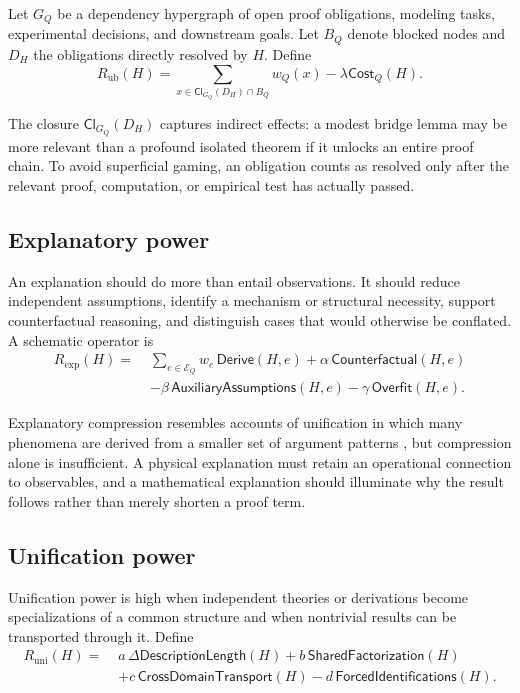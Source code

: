 \documentclass[11pt]{article}
\newcommand{\Cl}{\mathsf{Cl}}
\newcommand{\Cost}{\mathsf{Cost}}
\begin{document}
Let $G_Q$ be a dependency hypergraph of open proof obligations, modeling tasks, experimental
decisions, and downstream goals. Let $B_Q$ denote blocked nodes and $D_H$ the obligations directly
resolved by $H$. Define
\begin{equation}
R_{\mathrm{ub}}(H)
=
\sum_{x\in \Cl_{G_Q}(D_H)\cap B_Q}w_Q(x)
-\lambda\Cost_Q(H).
\end{equation}

The closure $\Cl_{G_Q}(D_H)$ captures indirect effects: a modest bridge lemma may be more relevant
than a profound isolated theorem if it unlocks an entire proof chain. To avoid superficial gaming,
an obligation counts as resolved only after the relevant proof, computation, or empirical test has
actually passed.

\subsection{Explanatory power}

An explanation should do more than entail observations. It should reduce independent assumptions,
identify a mechanism or structural necessity, support counterfactual reasoning, and distinguish cases
that would otherwise be conflated. A schematic operator is
\begin{align}
R_{\mathrm{exp}}(H)
=\;&\sum_{e\in\mathcal{E}_Q}w_e\,
\mathsf{Derive}(H,e)
+\alpha\,\mathsf{Counterfactual}(H,e) \\
&-\beta\,\mathsf{AuxiliaryAssumptions}(H,e)
-\gamma\,\mathsf{Overfit}(H,e).
\end{align}

Explanatory compression resembles accounts of unification in which many phenomena are derived from a
smaller set of argument patterns \cite{kitcher1981}, but compression alone is insufficient. A physical
explanation must retain an operational connection to observables, and a mathematical explanation
should illuminate why the result follows rather than merely shorten a proof term.

\subsection{Unification power}

Unification power is high when independent theories or derivations become specializations of a common
structure and when nontrivial results can be transported through it. Define
\begin{align}
R_{\mathrm{uni}}(H)
=\;&a\,\Delta\mathsf{DescriptionLength}(H)
+b\,\mathsf{SharedFactorization}(H) \\
&+c\,\mathsf{CrossDomainTransport}(H)
-d\,\mathsf{ForcedIdentifications}(H).
\end{align}
\end{document}
